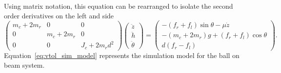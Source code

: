 Using matrix notation, this equation can be rearranged to isolate the second order derivatives on the left and side
\begin{equation}\label{eq:vtol_sim_model}
\begin{pmatrix}
m_c + 2 m_r & 0           & 0 \\
0           & m_c + 2 m_r & 0 \\
0           & 0           & J_c + 2 m_r d^2
\end{pmatrix}
\begin{pmatrix}
\ddot{z} \\
\ddot{h} \\
\ddot{\theta}
\end{pmatrix}
=
\begin{pmatrix}
-(f_r + f_l) \sin\theta - \mu\dot{z} \\
-(m_c + 2 m_r) g + (f_r + f_l) \cos\theta \\
d \left( f_r - f_l \right)
\end{pmatrix}.
\end{equation}
Equation~\eqref{eq:vtol_sim_model} represents the simulation model for the ball on beam system.

